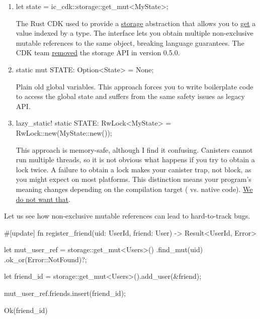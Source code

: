 \documentclass{article}
\begin{document}
\begin{enumerate}
\item
\begin{code}[bad]
let state = ic_cdk::storage::get_mut<MyState>;
\end{code}

The Rust CDK used to provide a \href{https://docs.rs/ic-cdk/0.3.2/ic_cdk/storage/index.html}{storage} abstraction that allows you to \href{https://docs.rs/ic-cdk/0.3.2/ic_cdk/storage/fn.get_mut.html}{get} a value indexed by a type.
The interface lets you obtain multiple non-exclusive mutable references to the same object, breaking language guarantees.
The CDK team \href{https://github.com/dfinity/cdk-rs/blob/c7aaaddaaf5e39c90a51035f87be68a0215c8c10/src/ic-cdk/CHANGELOG.md#changed-2}{removed} the storage API in version 0.5.0.

\item
\begin{code}[bad]
static mut STATE: Option<State> = None;
\end{code}

Plain old global variables.
This approach forces you to write boilerplate code to access the global state and suffers from the same safety issues as legacy  API.

\item
\begin{code}[bad]
lazy_static! {
    static STATE: RwLock<MyState> = RwLock::new(MyState::new());
}
\end{code}

This approach is memory-safe, although I find it confusing.
Canisters cannot run multiple threads, so it is not obvious what happens if you try to obtain a lock twice.
A failure to obtain a lock makes your canister trap, not block, as you might expect on most platforms.
This distinction means your program's meaning changes depending on the compilation target ( vs. native code).
\href{#target-independent}{We do not want that}.
\end{enumerate}

Let us see how non-exclusive mutable references can lead to hard-to-track bugs.

\begin{code}[bad]
#[update]
fn register_friend(uid: UserId, friend: User) -> Result<UserId, Error> {
    let mut_user_ref = storage::get_mut<Users>() 
                           .find_mut(uid)
                           .ok_or(Error::NotFound)?;

    let friend_id = storage::get_mut<Users>().add_user(&friend); 

    mut_user_ref.friends.insert(friend_id); 

    Ok(friend_id)
}
\end{code}
\end{document}
